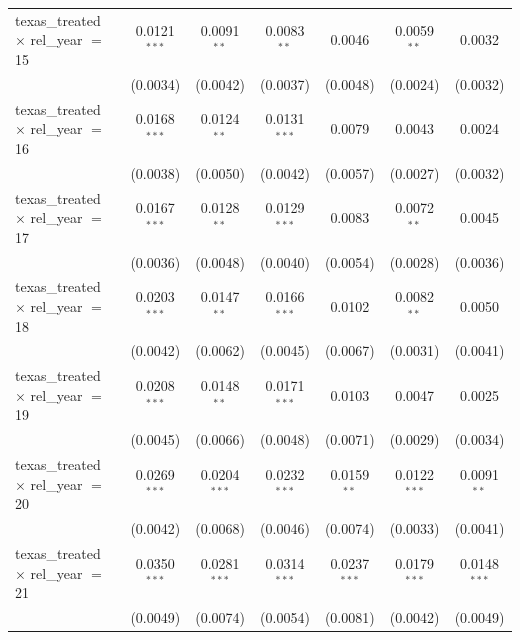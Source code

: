 \begin{tabular}{lcccccc}
   texas\_treated $\times$ rel\_year $=$ 15     & 0.0121$^{***}$ & 0.0091$^{**}$  & 0.0083$^{**}$  & 0.0046         & 0.0059$^{**}$   & 0.0032\\   
                                                & (0.0034)       & (0.0042)       & (0.0037)       & (0.0048)       & (0.0024)        & (0.0032)\\   
   texas\_treated $\times$ rel\_year $=$ 16     & 0.0168$^{***}$ & 0.0124$^{**}$  & 0.0131$^{***}$ & 0.0079         & 0.0043          & 0.0024\\   
                                                & (0.0038)       & (0.0050)       & (0.0042)       & (0.0057)       & (0.0027)        & (0.0032)\\   
   texas\_treated $\times$ rel\_year $=$ 17     & 0.0167$^{***}$ & 0.0128$^{**}$  & 0.0129$^{***}$ & 0.0083         & 0.0072$^{**}$   & 0.0045\\   
                                                & (0.0036)       & (0.0048)       & (0.0040)       & (0.0054)       & (0.0028)        & (0.0036)\\   
   texas\_treated $\times$ rel\_year $=$ 18     & 0.0203$^{***}$ & 0.0147$^{**}$  & 0.0166$^{***}$ & 0.0102         & 0.0082$^{**}$   & 0.0050\\   
                                                & (0.0042)       & (0.0062)       & (0.0045)       & (0.0067)       & (0.0031)        & (0.0041)\\   
   texas\_treated $\times$ rel\_year $=$ 19     & 0.0208$^{***}$ & 0.0148$^{**}$  & 0.0171$^{***}$ & 0.0103         & 0.0047          & 0.0025\\   
                                                & (0.0045)       & (0.0066)       & (0.0048)       & (0.0071)       & (0.0029)        & (0.0034)\\   
   texas\_treated $\times$ rel\_year $=$ 20     & 0.0269$^{***}$ & 0.0204$^{***}$ & 0.0232$^{***}$ & 0.0159$^{**}$  & 0.0122$^{***}$  & 0.0091$^{**}$\\   
                                                & (0.0042)       & (0.0068)       & (0.0046)       & (0.0074)       & (0.0033)        & (0.0041)\\   
   texas\_treated $\times$ rel\_year $=$ 21     & 0.0350$^{***}$ & 0.0281$^{***}$ & 0.0314$^{***}$ & 0.0237$^{***}$ & 0.0179$^{***}$  & 0.0148$^{***}$\\   
                                                & (0.0049)       & (0.0074)       & (0.0054)       & (0.0081)       & (0.0042)        & (0.0049)\\   

\end{tabular}

